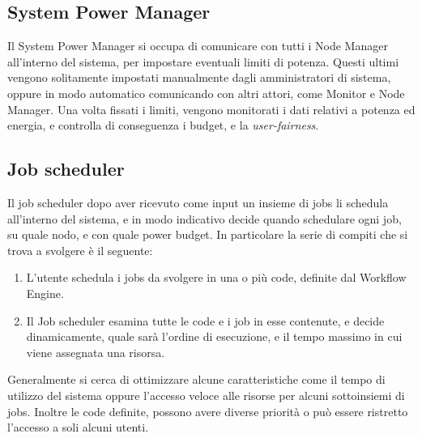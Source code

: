 \subsection{System Power Manager}
Il System Power Manager si occupa di comunicare con tutti i Node Manager all'interno del sistema, per impostare eventuali limiti di potenza. Questi ultimi vengono solitamente impostati manualmente dagli amministratori di sistema, oppure in modo automatico comunicando con altri attori, come Monitor e Node Manager. Una volta fissati i limiti, vengono monitorati i dati relativi a potenza ed energia, e controlla di conseguenza i budget, e la \emph{user-fairness}.
\subsection{Job scheduler}
Il job scheduler dopo aver ricevuto come input un insieme di jobs li schedula all'interno del sistema, e in modo indicativo decide quando schedulare ogni job, su quale nodo, e con quale power budget. In particolare la serie di compiti che si trova a svolgere è il seguente:
\begin{enumerate}
    \item L'utente schedula i jobs da svolgere in una o più code, definite dal Workflow Engine.
    \item Il Job scheduler esamina tutte le code e i job in esse contenute, e decide dinamicamente, quale sarà l'ordine di esecuzione, e il tempo massimo in cui viene assegnata una risorsa.
\end{enumerate}
Generalmente si cerca di ottimizzare alcune caratteristiche come il tempo di utilizzo del sistema oppure l'accesso veloce alle risorse per alcuni sottoinsiemi di jobs. Inoltre le code definite, possono avere diverse priorità o può essere ristretto l'accesso a soli alcuni utenti.%

